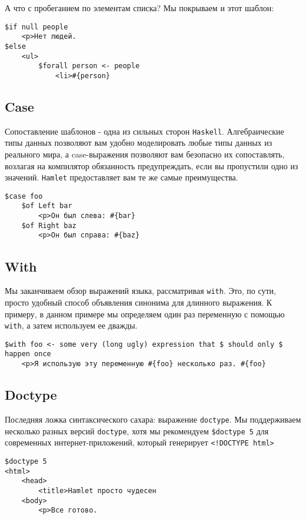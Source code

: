 А что с пробеганием по элементам списка? Мы покрываем и этот шаблон:

\begin{lstlisting}
$if null people
    <p>Нет людей.
$else
    <ul>
        $forall person <- people
            <li>#{person}
\end{lstlisting}


\subsection{Case}

Сопоставление шаблонов - одна из сильных сторон \texttt{Haskell}. Алгебраические типы данных
позволяют вам удобно моделировать любые типы данных из реального мира, а
case-выражения позволяют вам безопасно их сопоставлять, возлагая на компилятор
обязанность предупреждать, если вы пропустили одно из значений.
\texttt{Hamlet} предоставляет вам те же самые преимущества.

\begin{lstlisting}
$case foo
    $of Left bar
        <p>Он был слева: #{bar}
    $of Right baz
        <p>Он был справа: #{baz}
\end{lstlisting}

\subsection{With}

Мы заканчиваем обзор выражений языка, рассматривая \texttt{with}. Это, по сути,
просто удобный способ объявления синонима для длинного выражения. К примеру,
в данном примере мы определяем один раз переменную с помощью \texttt{with}, а затем
используем ее дважды.

\begin{lstlisting}
$with foo <- some very (long ugly) expression that $ should only $ happen once
    <p>Я использую эту переменную #{foo} несколько раз. #{foo}
\end{lstlisting}

\subsection{Doctype}
Последняя ложка синтаксического сахара: выражение \texttt{doctype}. Мы
поддерживаем несколько разных версий \texttt{doctype}, хотя мы рекомендуем
\lstinline!$doctype 5! для современных интернет-приложений, который генерирует
\lstinline'<!DOCTYPE html>'

\begin{lstlisting}
$doctype 5
<html>
    <head>
        <title>Hamlet просто чудесен
    <body>
        <p>Все готово.
\end{lstlisting}

